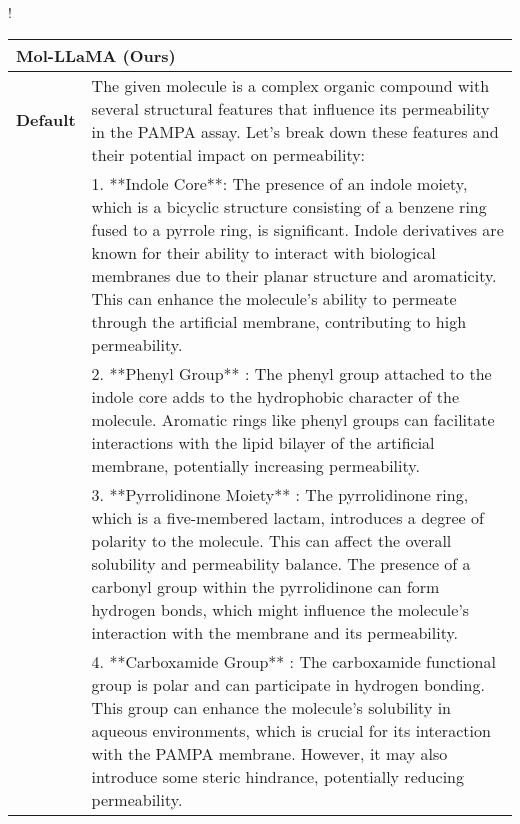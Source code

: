 
\begin{table}[ht!]
\begin{resizebox}{\linewidth}{!}{
\centering
\renewcommand{\arraystretch}{1.05}
\begin{tabular}{p{1.2cm} p{18cm}}
\toprule
\multicolumn{2}{l}{\large \textbf{Mol-LLaMA (Ours)}}  \\
\midrule

\textbf{Default} & The given molecule is a complex organic compound with several structural features that influence its permeability in the PAMPA assay. Let's break down these features and their potential impact on permeability: \\

& 1. \textcolor{tabblue}{**Indole Core**}: The presence of an indole moiety, which is a bicyclic structure consisting of a benzene ring fused to a pyrrole ring, is significant. \textcolor{tabblue}{Indole derivatives are known for their ability to interact with biological membranes due to their planar structure and aromaticity}. This can enhance the molecule's ability to permeate through the artificial membrane, contributing to high permeability. \\

& 2. \textcolor{tabblue}{**Phenyl Group**} : The phenyl group attached to the indole core \textcolor{tabblue}{adds to the hydrophobic character of the molecule}. Aromatic rings like phenyl groups can \textcolor{tabblue}{facilitate interactions with the lipid bilayer} of the artificial membrane, potentially increasing permeability. \\

& 3. \textcolor{tabblue}{**Pyrrolidinone Moiety**} : The pyrrolidinone ring, which is a five-membered lactam, introduces a degree of polarity to the molecule. \textcolor{tabblue}{This can affect the overall solubility and permeability balance}. The presence of a carbonyl group within the pyrrolidinone can form hydrogen bonds, which might influence the molecule's interaction with the membrane and its permeability. \\

& 4. \textcolor{tabblue}{**Carboxamide Group**} : The carboxamide functional group is polar and can participate in hydrogen bonding. This group can \textcolor{tabblue}{enhance the molecule's solubility in aqueous environments}, which is crucial for its interaction with the PAMPA membrane. However, \textcolor{tabblue}{it may also introduce some steric hindrance, potentially reducing permeability.} \\


\end{tabular}}
\end{resizebox}
\end{table}
